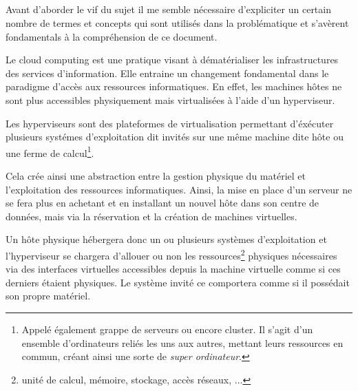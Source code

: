 \documentclass[11pt, a4paper ]{article}
\begin{document}
			\subsection*{}

Avant d'aborder le vif du sujet il me semble nécessaire d'expliciter un certain nombre de termes et concepts qui sont utilisés dans la problématique et s'avèrent fondamentals à la compréhension de ce document.

Le cloud computing\cite{cloudDef} est une pratique visant à dématérialiser les infrastructures des services d'information. Elle entraine un changement fondamental dans le paradigme d'accès aux ressources informatiques. En effet, les machines hôtes ne sont plus accessibles physiquement mais virtualisées à l'aide d'un hyperviseur.

Les hyperviseurs sont des plateformes de virtualisation permettant d'éxécuter plusieurs systémes d'exploitation dit invités sur une même machine dite hôte ou une ferme de calcul\footnote{Appelé également grappe de serveurs ou encore cluster. Il s'agit d'un ensemble d'ordinateurs reliés les uns aux autres, mettant leurs ressources en commun, créant ainsi une sorte de \emph{super ordinateur}. }.

Cela crée ainsi une abstraction entre la gestion physique du matériel et l'exploitation des ressources informatiques. Ainsi, la mise en place d'un serveur ne se fera plus en achetant et en installant un nouvel hôte dans son centre de données, mais via la réservation et la création de machines virtuelles.

Un hôte physique hébergera donc un ou plusieurs systèmes d'exploitation et l'hyperviseur se chargera d'allouer ou non les ressources\footnote{unité de calcul, mémoire, stockage, accès réseaux, ...}  physiques nécessaires via des interfaces virtuelles accessibles depuis la machine virtuelle comme si ces derniers étaient physiques. Le système invité ce comportera comme si il possédait son propre matériel.
\end{document}
